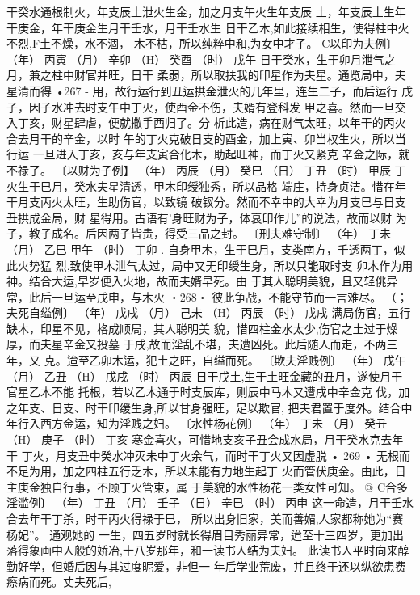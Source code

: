 干癸水通根制火，年支辰土泄火生金，加之月支午火生年支辰
土，年支辰土生年干庚金，年干庚金生月干壬水，月干壬水生
日干乙木,如此接续相生，使得柱中火不烈,F土不燥，水不涸，
木不枯，所以纯粹中和,为女中才子。
C以印为夫例〕
（年） 丙寅
（月） 辛卯
（H） 癸酉
（时） 戊午
日干癸水，生于卯月泄气之月，兼之柱中财官并旺，日干
柔弱，所以取扶我的印星作为夫星。通览局中，夫星清而得
•267 -
用，故行运行到丑运拱金泄火的几年里，连生二子，而后运行
戊子，因子水冲去时支午中丁火，使酉金不伤，夫婿有登科发
甲之喜。然而一旦交入丁亥，财星肆虐，便就撒手西归了。分
析此造，病在财气太旺，以年干的丙火合去月干的辛金，以时
午的丁火克破日支的酉金，加上寅、卯当权生火，所以当行运
一旦进入丁亥，亥与年支寅合化木，助起旺神，而丁火又紧克
辛金之际，就不禄了。
〔以财为子例】
（年） 丙辰
（月） 癸巳
（日） 丁丑
（时） 甲辰
丁火生于巳月，癸水夫星清透，甲木印绶独秀，所以品格
端庄，持身贞洁。惜在年干月支丙火太旺，生助伤官，以致镜
破钗分。然而不幸中的大幸为月支巳与日支丑拱成金局，财
星得用。古语有'身旺财为子，体衰印作儿”的说法，故而以财
为子，教子成名。后因两子皆贵，得受三品之封。
〔刑夫难守制〕
（年） 丁未
（月） 乙巳
甲午
（时） 丁卯 .
自身甲木，生于巳月，支类南方，千透两丁，似此火势猛
烈,致使甲木泄气太过，局中又无印绶生身，所以只能取时支
卯木作为用神。结合大运,早岁便入火地，故而夫婿早死。由
于其人聪明美貌，且又轻佻异常，此后一旦运至戊申，与木火
・268・
彼此争战，不能守节而一言难尽。
（；夫死自缢例〕
（年） 戊戌
（月） 己未
（H） 丙辰
（时） 戊戌
满局伤官，五行缺木，印星不见，格成顺局，其人聪明美
貌，惜四柱金水太少,伤官之土过于燥厚，而夫星辛金又投墓
于戌,故而淫乱不堪，夫遭凶死。此后随人而走，不两三年，又
克。迨至乙卯木运，犯土之旺，自缢而死。
〔欺夫淫贱例〕
（年） 戊午
（月） 乙丑
（H） 戊戌
（时） 丙辰
日干戊土,生于土旺金藏的丑月，遂使月干官星乙木不能
托根，若以乙木通于时支辰库，则辰中马木又遭戌中辛金克
伐，加之年支、日支、时干印缓生身,所以甘身强旺，足以欺官,
把夫君置于度外。结合中年行入西方金运，知为淫贱之妇。
〔水性杨花例〕
（年） 丁未
（月） 癸丑
（H） 庚子
（时） 丁亥
寒金喜火，可惜地支亥子丑会成水局，月干癸水克去年干
丁火，月支丑中癸水冲灭未中丁火余气，而时干丁火又因虚脱
• 269 •
无根而不足为用，加之四柱五行乏木，所以未能有力地生起丁
火而管伏庚金。由此，日主庚金独自行事，不顾丁火管束，属
于美貌的水性杨花一类女性可知。
@ C合多淫滥例〕
（年） 丁丑
（月） 壬子
（日） 辛巳
（时） 丙申
这一命造，月干壬水合去年干丁杀，时干丙火得禄于巳，
所以出身旧家，美而善媚,人家都称她为“赛杨妃”。 通观她的
一生，四五岁时就长得眉目秀丽异常，迨至十三四岁，更加出
落得象画中人般的娇冶,十八岁那年，和一读书人结为夫妇。
此读书人平时向来醇勤好学，但婚后因与其过度昵爱，非但一
年后学业荒废，并且终于还以纵欲患费瘵病而死。丈夫死后,
